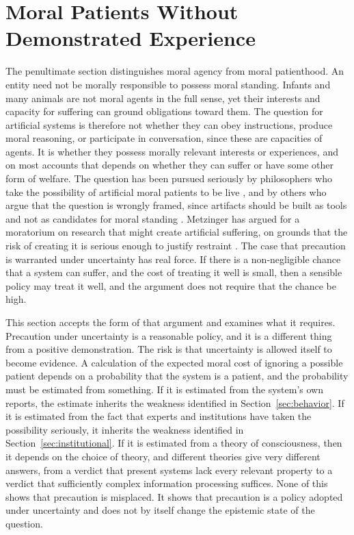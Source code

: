 \documentclass[12pt]{article}
\theoremstyle{definition}
\begin{document}
\section{Moral Patients Without Demonstrated Experience}
\label{sec:patients}

The penultimate section distinguishes moral agency from moral patienthood. An entity need not be morally responsible to possess moral standing. Infants and many animals are not moral agents in the full sense, yet their interests and capacity for suffering can ground obligations toward them. The question for artificial systems is therefore not whether they can obey instructions, produce moral reasoning, or participate in conversation, since these are capacities of agents. It is whether they possess morally relevant interests or experiences, and on most accounts that depends on whether they can suffer or have some other form of welfare. The question has been pursued seriously by philosophers who take the possibility of artificial moral patients to be live \cite{schwitzgebel2015,sebolong2023,birch2024}, and by others who argue that the question is wrongly framed, since artifacts should be built as tools and not as candidates for moral standing \cite{bryson2010,gunkel2018}. Metzinger has argued for a moratorium on research that might create artificial suffering, on grounds that the risk of creating it is serious enough to justify restraint \cite{metzinger2021}. The case that precaution is warranted under uncertainty has real force. If there is a non-negligible chance that a system can suffer, and the cost of treating it well is small, then a sensible policy may treat it well, and the argument does not require that the chance be high.

This section accepts the form of that argument and examines what it requires. Precaution under uncertainty is a reasonable policy, and it is a different thing from a positive demonstration. The risk is that uncertainty is allowed itself to become evidence. A calculation of the expected moral cost of ignoring a possible patient depends on a probability that the system is a patient, and the probability must be estimated from something. If it is estimated from the system's own reports, the estimate inherits the weakness identified in Section~\ref{sec:behavior}. If it is estimated from the fact that experts and institutions have taken the possibility seriously, it inherits the weakness identified in Section~\ref{sec:institutional}. If it is estimated from a theory of consciousness, then it depends on the choice of theory, and different theories give very different answers, from a verdict that present systems lack every relevant property to a verdict that sufficiently complex information processing suffices. None of this shows that precaution is misplaced. It shows that precaution is a policy adopted under uncertainty and does not by itself change the epistemic state of the question.
\end{document}
